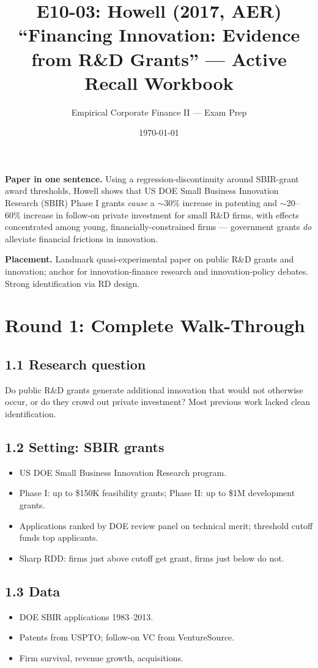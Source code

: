 \documentclass[11pt]{article}
\title{E10-03: Howell (2017, AER) \\
\large ``Financing Innovation: Evidence from R\&D Grants'' --- Active Recall Workbook}
\author{Empirical Corporate Finance II --- Exam Prep}
\date{\today}
\begin{document}
\maketitle

\begin{keybox}
\textbf{Paper in one sentence.} Using a regression-discontinuity around SBIR-grant award thresholds, Howell shows that US DOE Small Business Innovation Research (SBIR) Phase I grants \emph{cause} a $\sim$30\% increase in patenting and $\sim$20--60\% increase in follow-on private investment for small R\&D firms, with effects concentrated among young, financially-constrained firms --- government grants \emph{do} alleviate financial frictions in innovation.

\textbf{Placement.} Landmark quasi-experimental paper on public R\&D grants and innovation; anchor for innovation-finance research and innovation-policy debates. Strong identification via RD design.
\end{keybox}

\section*{Round 1: Complete Walk-Through}

\subsection*{1.1 Research question}
Do public R\&D grants generate additional innovation that would not otherwise occur, or do they crowd out private investment? Most previous work lacked clean identification.

\subsection*{1.2 Setting: SBIR grants}
\begin{itemize}
\item US DOE Small Business Innovation Research program.
\item Phase I: up to \$150K feasibility grants; Phase II: up to \$1M development grants.
\item Applications ranked by DOE review panel on technical merit; threshold cutoff funds top applicants.
\item Sharp RDD: firms just above cutoff get grant, firms just below do not.
\end{itemize}

\subsection*{1.3 Data}
\begin{itemize}
\item DOE SBIR applications 1983--2013.
\item Patents from USPTO; follow-on VC from VentureSource.
\item Firm survival, revenue growth, acquisitions.
\end{itemize}
\end{document}
